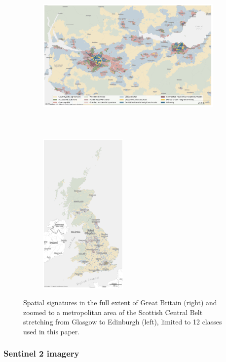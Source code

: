 \begin{figure}
    \centering
    \begin{subfigure}[b]{0.8\textwidth}
        \centering
        \includegraphics[height=8cm]{fig/signatures_scottish_belt_12_classes.png}
     \end{subfigure}
    \hfill
    \begin{subfigure}[b]{0.19\textwidth}
        \centering
        \includegraphics[height=8cm]{fig/signatures_gb_12_classes.png}
    \end{subfigure}
    \caption{Spatial signatures in the full extent of Great Britain (right) and zoomed to a
metropolitan area of the Scottish Central Belt stretching from Glasgow to
Edinburgh (left),
limited to 12 classes used in this paper.}
\label{fig:signatures}
\end{figure}


\subsubsection{Sentinel 2 imagery}

